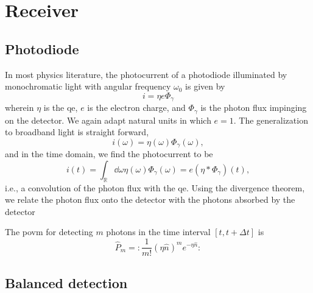 \section{Receiver}

\subsection{Photodiode}

In most physics literature, the photocurrent of a photodiode illuminated by monochromatic light with angular frequency $\omega_0$ is given by~\cite[p.~650]{Saleh2007}
\begin{equation}
	i
	=
	\eta
	e
	\Phi_\gamma
\end{equation}
wherein $\eta$ is the \gls{qe}, $e$ is the electron charge, and $\Phi_\gamma$ is the photon flux impinging on the detector.
We again adapt natural units in which $e=1$.
The generalization to broadband light is straight forward,
\begin{equation}
	i(\omega)
	=
	\eta(\omega)
	\Phi_\gamma(\omega)
	,
\end{equation}
and in the time domain, we find the photocurrent to be
\begin{equation}
	i(t)
	=
	\int_\mathbb{R}\dd{\omega}
	\eta(\omega)
	\Phi_\gamma(\omega)
	=
	e\left(\eta*\Phi_\gamma\right)(t)
	,
\end{equation}
i.e., a convolution of the photon flux with the \gls{qe}.
Using the divergence theorem, we relate the photon flux onto the detector with the photons absorbed by the detector

The \gls{povm} for detecting $m$ photons in the time interval $[t,t+\Delta t]$ is~\cite[p.~192]{Vogel2006}
\begin{equation}
	\hat{P}_m
	=
	\colon
	\frac{1}{m!}
	\left(\eta\hat{n}\right)^m
	e^{-\eta\hat{n}}
	\colon
\end{equation}



\subsection{Balanced detection}

